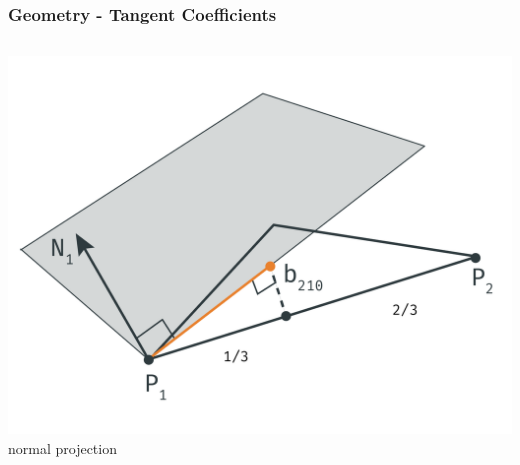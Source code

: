 \begin{frame}\frametitle{Geometry - Tangent Coefficients}
	\begin{columns}
		\begin{column}{0.6\textwidth}
			\begin{center}
			\includegraphics[width=\textwidth]{img/1_single/geometry_2.png}
			\small{normal projection}
			\end{center}
		\end{column}
	\end{columns}
\end{frame}


